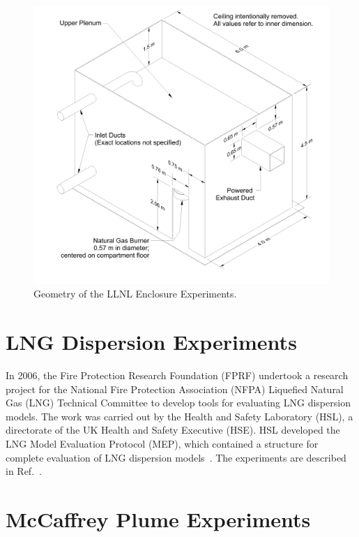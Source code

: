 \begin{figure}[p]
\includegraphics[width=\textwidth]{FIGURES/LLNL_Enclosure/LLNL_Enclosure_Drawing}
\caption[Geometry of the LLNL Enclosure Experiments]{Geometry of the LLNL Enclosure Experiments.}
\label{LLNL_Enclosure_Drawing}
\end{figure}


\section{LNG Dispersion Experiments}

In 2006, the Fire Protection Research Foundation (FPRF) undertook a research project for the National Fire Protection Association (NFPA) Liquefied Natural Gas (LNG) Technical Committee to develop tools for evaluating LNG dispersion models. The work was carried out by the Health and Safety Laboratory (HSL), a directorate of the UK Health and Safety Executive (HSE). HSL developed the LNG Model Evaluation Protocol (MEP), which contained a structure for complete evaluation of LNG dispersion models~\cite{Ivings:HSL}. The experiments are described in Ref.~\cite{Stewart:HSL}.


\section{McCaffrey Plume Experiments}

